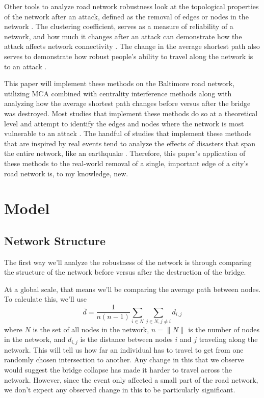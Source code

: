 \documentclass[11pt]{article}
\numberwithin{equation}{section} %
\numberwithin{figure}{section} %
\numberwithin{table}{section} %
\theoremstyle{definition}
\begin{document}
Other tools to analyze road network robustness look at the topological properties of the network after an attack, defined as the removal of edges or nodes in the network \parencite{Holme02}. The clustering coefficient, serves as a measure of reliability of a network, and how much it changes after an attack can demonstrate how the attack affects network connectivity \parencite{Xeumei10}. The change in the average shortest path also serves to demonstrate how robust people's ability to travel along the network is to an attack \parencites{Xeumei10}{Kaub24}.

This paper will implement these methods on the Baltimore road network, utilizing MCA combined with centrality interference methods along with analyzing how the average shortest path changes before versus after the bridge was destroyed. Most studies that implement these methods do so at a theoretical level and attempt to identify the edges and nodes where the network is most vulnerable to an attack \parencites{Xeumei10}{Ando21}{Masuccia16}{Julliard15}{Holme02}. The handful of studies that implement these methods that are inspired by real events tend to analyze the effects of disasters that span the entire network, like an earthquake \parencites{Kaub24}{Sakakibara04}. Therefore, this paper's application of these methods to the real-world removal of a single, important edge of a city's road network is, to my knowledge, new.


\section{Model} \label{sec:model}

\subsection{Network Structure}

The first way we'll analyze the robustness of the network is through comparing the structure of the network before versus after the destruction of the bridge.

At a global scale, that means we'll be comparing the average path between nodes. To calculate this, we'll use
\[
  \overline{d} = \frac{1}{n(n-1)} \sum_{i \in N} \sum_{j \in N, j \neq i} d_{i, j}
\]
where $N$ is the set of all nodes in the network, $n = \| N \|$ is the number of nodes in the network, and $d_{i, j}$ is the distance between nodes $i$ and $j$ traveling along the network. This will tell us how far an individual has to travel to get from one randomly chosen intersection to another. Any change in this that we observe would suggest the bridge collapse has made it harder to travel across the network. However, since the event only affected a small part of the road network, we don't expect any observed change in this to be particularly significant.
\end{document}
